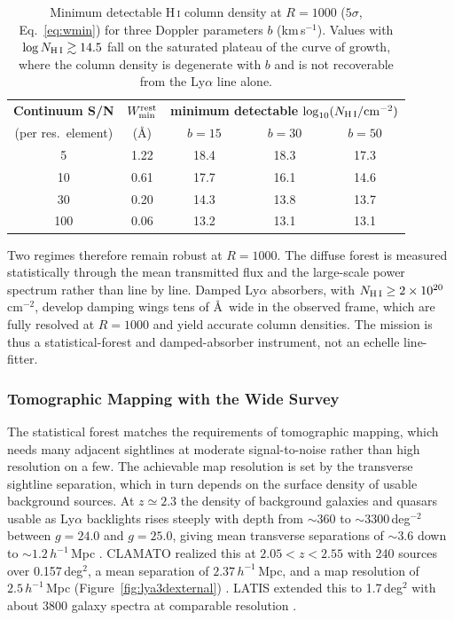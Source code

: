\documentclass[10pt,onecolumn]{article}
\begin{document}
\begin{table}[tp]
\centering
\sffamily\small
\begin{tabular}{@{}ccccc@{}}
\toprule
\textbf{Continuum S/N} & \textbf{$W_{\min}^{\rm rest}$} & \multicolumn{3}{c}{\textbf{minimum detectable $\log_{10}(N_{\rm H\,I}/{\rm cm^{-2}})$}}\\
(per res.\ element) & (\AA) & $b=15$ & $b=30$ & $b=50$ \\
\midrule
5 & 1.22 & 18.4 & 18.3 & 17.3\\
10 & 0.61 & 17.7 & 16.1 & 14.6\\
30 & 0.20 & 14.3 & 13.8 & 13.7\\
100 & 0.06 & 13.2 & 13.1 & 13.1\\
\bottomrule
\end{tabular}
\caption{Minimum detectable H\,\textsc{i} column density at $R=1000$ ($5\sigma$, Eq.~\eqref{eq:wmin}) for three Doppler parameters $b$ (km\,s$^{-1}$). Values with $\log N_{\rm H\,I}\gtrsim14.5$ fall on the saturated plateau of the curve of growth, where the column density is degenerate with $b$ and is not recoverable from the Ly$\alpha$ line alone.}
\label{tab:lyathresh}
\end{table}

Two regimes therefore remain robust at $R=1000$. The diffuse forest is measured statistically through the mean transmitted flux and the large-scale power spectrum rather than line by line. Damped Ly$\alpha$ absorbers, with $N_{\rm H\,I}\geq2\times10^{20}$\,cm$^{-2}$, develop damping wings tens of \AA\ wide in the observed frame, which are fully resolved at $R=1000$ and yield accurate column densities. The mission is thus a statistical-forest and damped-absorber instrument, not an echelle line-fitter.

\subsubsection{Tomographic Mapping with the Wide Survey}

The statistical forest matches the requirements of tomographic mapping, which needs many adjacent sightlines at moderate signal-to-noise rather than high resolution on a few. The achievable map resolution is set by the transverse sightline separation, which in turn depends on the surface density of usable background sources. At $z\simeq2.3$ the density of background galaxies and quasars usable as Ly$\alpha$ backlights rises steeply with depth from $\sim$360 to $\sim$3300\,deg$^{-2}$ between $g=24.0$ and $g=25.0$, giving mean transverse separations of $\sim3.6$ down to $\sim1.2\,h^{-1}$\,Mpc \cite{lee2014tomo}. CLAMATO realized this at $2.05<z<2.55$ with 240 sources over 0.157\,deg$^2$, a mean separation of $2.37\,h^{-1}$\,Mpc, and a map resolution of $2.5\,h^{-1}$\,Mpc (Figure~\ref{fig:lya3dexternal}) \cite{lee2018clamato}. LATIS extended this to 1.7\,deg$^2$ with about 3800 galaxy spectra at comparable resolution \cite{newman2020latis}.
\end{document}
